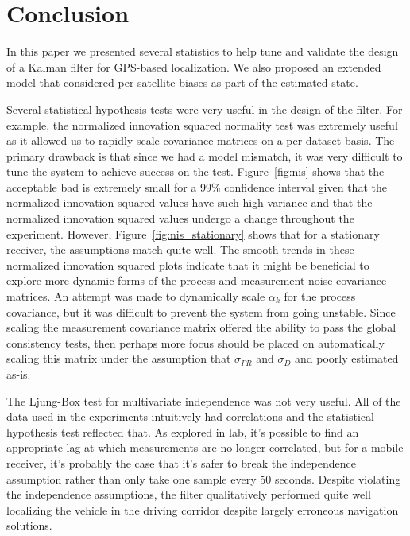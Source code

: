 \section{Conclusion}\label{sec:conclusion}
In this paper we presented several statistics to help tune and validate the design of a Kalman filter for GPS-based localization.  We also proposed an extended model that considered per-satellite biases as part of the estimated state.

Several statistical hypothesis tests were very useful in the design of the filter.  For example, the normalized innovation squared normality test was extremely useful as it allowed us to rapidly scale covariance matrices on a per dataset basis.  The primary drawback is that since we had a model mismatch, it was very difficult to tune the system to achieve success on the test.  Figure~\ref{fig:nis} shows that the acceptable bad is extremely small for a 99\% confidence interval given that the normalized innovation squared values have such high variance and that the normalized innovation squared values undergo a change throughout the experiment.  However, Figure~\ref{fig:nis_stationary} shows that for a stationary receiver, the assumptions match quite well.  The smooth trends in these normalized innovation squared plots indicate that it might be beneficial to explore more dynamic forms of the process and measurement noise covariance matrices.  An attempt was made to dynamically scale $\alpha_k$ for the process covariance, but it was difficult to prevent the system from going unstable.  Since scaling the measurement covariance matrix offered the ability to pass the global consistency tests, then perhaps more focus should be placed on automatically scaling this matrix under the assumption that $\sigma_{PR}$ and $\sigma_D$ and poorly estimated as-is.

The Ljung-Box test for multivariate independence was not very useful.  All of the data used in the experiments intuitively had correlations and the statistical hypothesis test reflected that.  As explored in lab, it's possible to find an appropriate lag at which measurements are no longer correlated, but for a mobile receiver, it's probably the case that it's safer to break the independence assumption rather than only take one sample every 50 seconds.  Despite violating the independence assumptions, the filter qualitatively performed quite well localizing the vehicle in the driving corridor despite largely erroneous navigation solutions.

